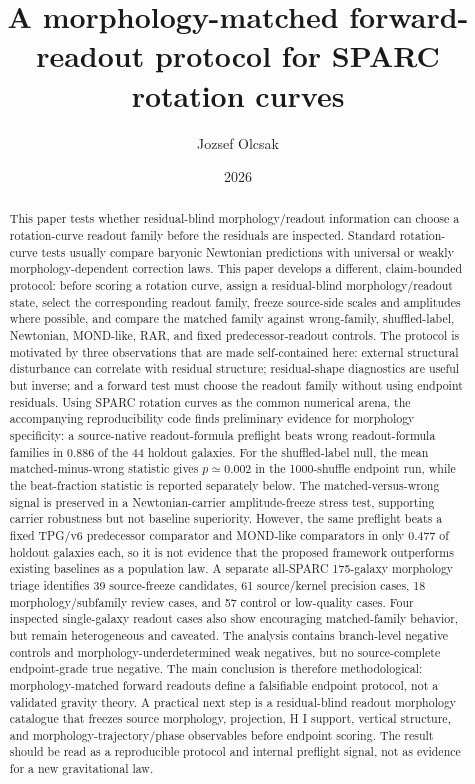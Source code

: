 \documentclass[11pt]{article}
\title{A morphology-matched forward-readout protocol for SPARC rotation curves}
\author{Jozsef Olcsak}
\date{2026}
\begin{document}
\maketitle

\begin{abstract}
This paper tests whether residual-blind morphology/readout information can
choose a rotation-curve readout family before the residuals are inspected.
Standard rotation-curve tests
usually compare baryonic Newtonian predictions with universal or weakly
morphology-dependent correction laws.  This paper develops a different,
claim-bounded protocol: before scoring a rotation curve, assign a
residual-blind morphology/readout state, select the corresponding readout
family, freeze source-side scales and amplitudes where possible, and compare the
matched family against wrong-family, shuffled-label, Newtonian, MOND-like, RAR,
and fixed predecessor-readout controls.  The protocol is motivated by three observations
that are made self-contained here: external structural disturbance can correlate
with residual structure; residual-shape diagnostics are useful but inverse; and
a forward test must choose the readout family without using endpoint residuals.
Using SPARC rotation curves as the common numerical arena, the accompanying reproducibility code
finds preliminary evidence for morphology specificity: a source-native
readout-formula preflight beats wrong readout-formula families in \(0.886\) of
the 44 holdout galaxies.  For the shuffled-label null, the mean
matched-minus-wrong statistic gives \(p\simeq0.002\) in the 1000-shuffle
endpoint run, while the beat-fraction statistic is reported separately below.
The matched-versus-wrong signal is preserved in a Newtonian-carrier
amplitude-freeze stress test, supporting carrier robustness but not baseline
superiority.
However,
the same preflight beats a fixed TPG/v6 predecessor comparator and MOND-like comparators in only \(0.477\) of
holdout galaxies each, so it is not evidence that the proposed framework
outperforms existing baselines as a population law.  A separate all-SPARC
175-galaxy morphology triage identifies 39 source-freeze candidates, 61
source/kernel precision cases, 18 morphology/subfamily review cases, and 57
control or low-quality cases.  Four inspected single-galaxy readout cases also
show encouraging matched-family behavior, but remain heterogeneous and
caveated.  The analysis contains branch-level negative controls and
morphology-underdetermined weak negatives, but no source-complete endpoint-grade
true negative.  The main conclusion is therefore
methodological: morphology-matched forward readouts define a falsifiable
endpoint protocol, not a validated gravity theory.  A practical next step is a
residual-blind readout morphology catalogue that freezes source morphology,
projection, H I support, vertical structure, and morphology-trajectory/phase
observables before endpoint scoring.  The result should be read as a reproducible protocol
and internal preflight signal, not as evidence for a new gravitational law.
\end{abstract}
\end{document}
